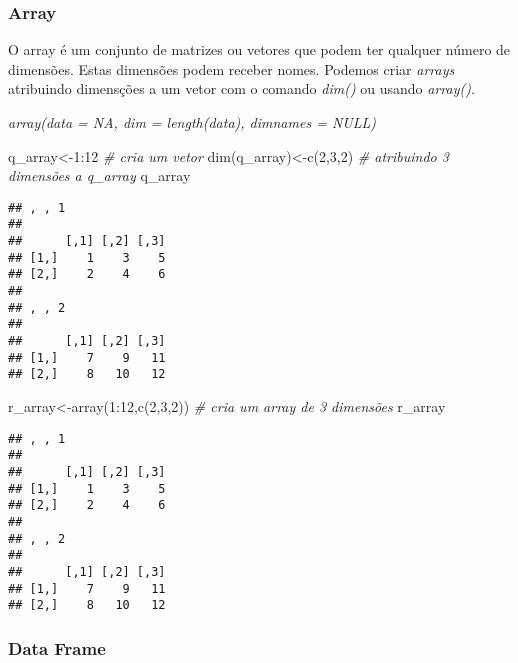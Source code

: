 \documentclass[
]{book}
\newenvironment{Shaded}{\begin{snugshade}}{\end{snugshade}}
\newcommand{\CommentTok}[1]{\textcolor[rgb]{0.56,0.35,0.01}{\textit{#1}}}
\newcommand{\DecValTok}[1]{\textcolor[rgb]{0.00,0.00,0.81}{#1}}
\newcommand{\FunctionTok}[1]{\textcolor[rgb]{0.00,0.00,0.00}{#1}}
\newcommand{\NormalTok}[1]{#1}
\newcommand{\OtherTok}[1]{\textcolor[rgb]{0.56,0.35,0.01}{#1}}
\newcommand{\SpecialCharTok}[1]{\textcolor[rgb]{0.00,0.00,0.00}{#1}}
\begin{document}
\hypertarget{array}{%
\subsubsection{Array}\label{array}}

O array é um conjunto de matrizes ou vetores que podem ter qualquer número de dimensões. Estas dimensões podem receber nomes.
Podemos criar \emph{arrays} atribuindo dimensções a um vetor com o comando \emph{dim()} ou usando \emph{array()}.

\emph{\emph{array(data = NA, dim = length(data), dimnames = NULL)}}

\begin{Shaded}
\begin{Highlighting}[]
\NormalTok{q\_array}\OtherTok{\textless{}{-}}\DecValTok{1}\SpecialCharTok{:}\DecValTok{12} \CommentTok{\# cria um vetor}
\FunctionTok{dim}\NormalTok{(q\_array)}\OtherTok{\textless{}{-}}\FunctionTok{c}\NormalTok{(}\DecValTok{2}\NormalTok{,}\DecValTok{3}\NormalTok{,}\DecValTok{2}\NormalTok{) }\CommentTok{\# atribuindo 3 dimensões a q\_array}
\NormalTok{q\_array}
\end{Highlighting}
\end{Shaded}

\begin{verbatim}
## , , 1
## 
##      [,1] [,2] [,3]
## [1,]    1    3    5
## [2,]    2    4    6
## 
## , , 2
## 
##      [,1] [,2] [,3]
## [1,]    7    9   11
## [2,]    8   10   12
\end{verbatim}

\begin{Shaded}
\begin{Highlighting}[]
\NormalTok{r\_array}\OtherTok{\textless{}{-}}\FunctionTok{array}\NormalTok{(}\DecValTok{1}\SpecialCharTok{:}\DecValTok{12}\NormalTok{,}\FunctionTok{c}\NormalTok{(}\DecValTok{2}\NormalTok{,}\DecValTok{3}\NormalTok{,}\DecValTok{2}\NormalTok{)) }\CommentTok{\# cria um array de 3 dimensões}
\NormalTok{r\_array}
\end{Highlighting}
\end{Shaded}

\begin{verbatim}
## , , 1
## 
##      [,1] [,2] [,3]
## [1,]    1    3    5
## [2,]    2    4    6
## 
## , , 2
## 
##      [,1] [,2] [,3]
## [1,]    7    9   11
## [2,]    8   10   12
\end{verbatim}

\hypertarget{data-frame}{%
\subsubsection{Data Frame}\label{data-frame}}
\end{document}
